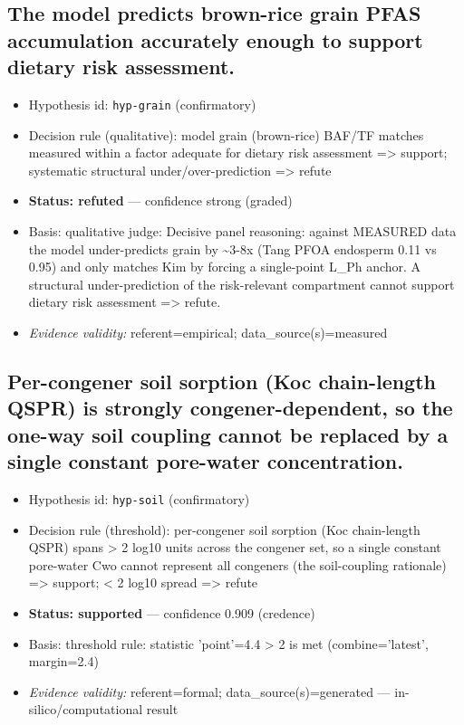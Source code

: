 \documentclass{article}
\begin{document}
\subsection{The model predicts brown-rice grain PFAS accumulation accurately enough to support dietary risk assessment.}
\begin{itemize}
  \item Hypothesis id: \texttt{hyp-grain} (confirmatory)
  \item Decision rule (qualitative): model grain (brown-rice) BAF/TF matches measured within a factor adequate for dietary risk assessment => support; systematic structural under/over-prediction => refute
  \item \textbf{Status: refuted} --- confidence strong (graded)
  \item Basis: qualitative judge: Decisive panel reasoning: against MEASURED data the model under-predicts grain by \textasciitilde{}3-8x (Tang PFOA endosperm 0.11 vs 0.95) and only matches Kim by forcing a single-point L\_Ph anchor. A structural under-prediction of the risk-relevant compartment cannot support dietary risk assessment => refute.
  \item \textit{Evidence validity:} referent=empirical; data\_source(s)=measured
\end{itemize}

\subsection{Per-congener soil sorption (Koc chain-length QSPR) is strongly congener-dependent, so the one-way soil coupling cannot be replaced by a single constant pore-water concentration.}
\begin{itemize}
  \item Hypothesis id: \texttt{hyp-soil} (confirmatory)
  \item Decision rule (threshold): per-congener soil sorption (Koc chain-length QSPR) spans > 2 log10 units across the congener set, so a single constant pore-water Cwo cannot represent all congeners (the soil-coupling rationale) => support; < 2 log10 spread => refute
  \item \textbf{Status: supported} --- confidence 0.909 (credence)
  \item Basis: threshold rule: statistic 'point'=4.4 > 2 is met (combine='latest', margin=2.4)
  \item \textit{Evidence validity:} referent=formal; data\_source(s)=generated --- in-silico/computational result
\end{itemize}
\end{document}
